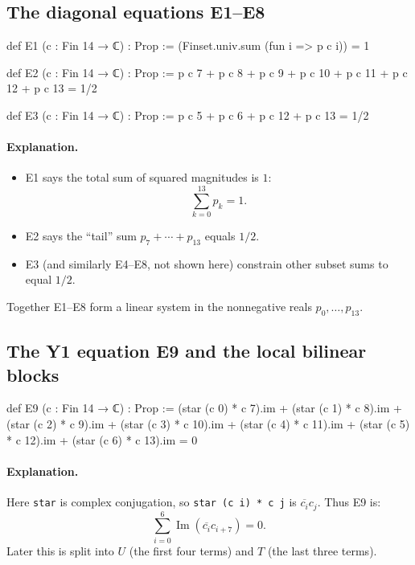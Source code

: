 \documentclass[11pt]{article}
\begin{document}
\subsection*{The diagonal equations E1--E8}

\begin{LeanCode}
def E1 (c : Fin 14 → ℂ) : Prop :=
  (Finset.univ.sum (fun i => p c i)) = 1

def E2 (c : Fin 14 → ℂ) : Prop :=
  p c 7 + p c 8 + p c 9 + p c 10 + p c 11 + p c 12 + p c 13 = 1/2

def E3 (c : Fin 14 → ℂ) : Prop :=
  p c 5 + p c 6 + p c 12 + p c 13 = 1/2
\end{LeanCode}

\paragraph{Explanation.}
\begin{itemize}
\item E1 says the total sum of squared magnitudes is $1$:
  \[
  \sum_{k=0}^{13} p_k = 1.
  \]
\item E2 says the ``tail'' sum $p_7+\cdots+p_{13}$ equals $1/2$.
\item E3 (and similarly E4--E8, not shown here) constrain other subset sums to equal $1/2$.
\end{itemize}

Together E1--E8 form a linear system in the nonnegative reals $p_0,\dots,p_{13}$.

\subsection*{The Y1 equation E9 and the local bilinear blocks}

\begin{LeanCode}
def E9 (c : Fin 14 → ℂ) : Prop :=
  (star (c 0) * c 7).im + (star (c 1) * c 8).im +
  (star (c 2) * c 9).im + (star (c 3) * c 10).im +
  (star (c 4) * c 11).im + (star (c 5) * c 12).im +
  (star (c 6) * c 13).im = 0
\end{LeanCode}

\paragraph{Explanation.}
Here \texttt{star} is complex conjugation, so \texttt{star (c i) * c j} is $\overline{c_i}c_j$.
Thus E9 is:
\[
\sum_{i=0}^{6} \operatorname{Im}(\overline{c_i}c_{i+7}) = 0.
\]
Later this is split into $U$ (the first four terms) and $T$ (the last three terms).
\end{document}
